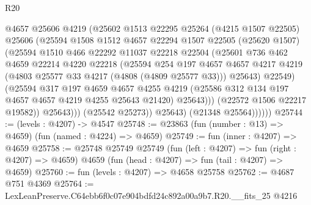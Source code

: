 \begin{lexlean}{R20}
\begin{coremodule}
                        @4657
                        @25606
                        @4219
                        (@25602
                          @1513
                          @22295
                          @25264
                          (@4215 @1507 @22505)
                          @25606
                          (@25594
                            @1508
                            @1512
                            @4657
                            @22294
                            @1507
                            @22505
                            (@25620 @1507)
                            (@25594
                              @1510
                              @466
                              @22292
                              @11037
                              @22218
                              @22504
                              (@25601
                                @736
                                @462
                                @4659
                                @22214
                                @4220
                                @22218
                                (@25594
                                  @254
                                  @197
                                  @4657
                                  @4657
                                  @4217
                                  @4219
                                  (@4803 @25577 @33 @4217 (@4808 (@4809 @25577 @33)))
                                  @25643)
                                @22549)
                              (@25594
                                @317
                                @197
                                @4659
                                @4657
                                @4255
                                @4219
                                (@25586 @312 @134 @197 @4657 @4657 @4219 @4255 @25643 @21420)
                                @25643)))
                          (@22572 @1506 @22217 @19582))
                        @25643)))
                  (@25542 @25273))
                @25643)
              (@21348 @25564))))))
@25744 := (levels : @4207) -> @4547
@25748 := @23863 (fun (number : @13) => @4659) (fun (named : @4224) => @4659)
@25749 := fun (inner : @4207) => @4659
@25758 := @25748
    @25749
    @25749
    (fun (left : @4207) => fun (right : @4207) => @4659)
    @4659
    (fun (head : @4207) => fun (tail : @4207) => @4659)
@25760 := fun (levels : @4207) => @4658 @25758
@25762 := @4687 @751 @4369
@25764 := LexLeanPreserve.C64ebb6f0c07e904bdfd24c892a00a9b7.R20.__fits_25 @4216

\end{coremodule}
\end{lexlean}
